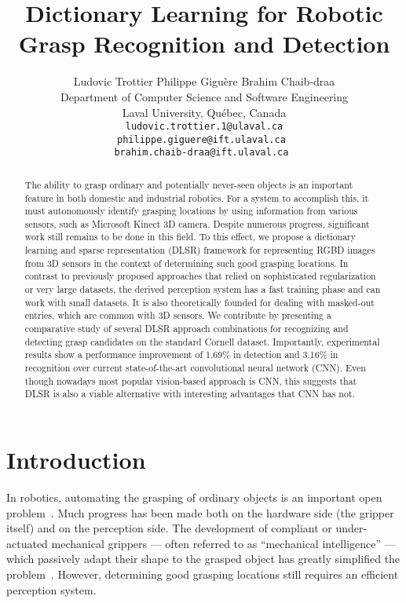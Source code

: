 \documentclass[svgnames]{scrartcl}
\title{Dictionary Learning for Robotic Grasp Recognition and Detection}
\author{
  Ludovic Trottier \qquad  Philippe Gigu\`ere  \qquad  Brahim Chaib-draa \\
  Department of Computer Science and Software Engineering \\
  Laval University, Qu\'ebec, Canada \\
  \texttt{ludovic.trottier.1@ulaval.ca} \\
  \texttt{philippe.giguere@ift.ulaval.ca } \\
  \texttt{brahim.chaib-draa@ift.ulaval.ca } \\
}
\date{}
\begin{document}
\maketitle

\begin{abstract}

The ability to grasp ordinary and potentially never-seen objects is an important feature in both domestic and industrial robotics. For a system to accomplish this, it must autonomously identify grasping locations by using information from various sensors, such as Microsoft Kinect 3D camera. Despite numerous progress, significant work still remains to be done in this field. To this effect, we propose a dictionary learning and sparse representation (DLSR) framework for representing RGBD images from 3D sensors in the context of determining such good grasping locations. In contrast to previously proposed approaches that relied on sophisticated regularization or very large datasets, the derived perception system has a fast training phase and can work with small datasets. It is also theoretically founded for dealing with masked-out entries, which are common with 3D sensors. We contribute by presenting a comparative study of several DLSR approach combinations for recognizing and detecting grasp candidates on the standard Cornell dataset. Importantly, experimental results show a performance improvement of 1.69\% in detection and 3.16\% in recognition over current state-of-the-art convolutional neural network (CNN). Even though nowadays most popular vision-based approach is CNN, this suggests that DLSR is also a viable alternative with interesting advantages that CNN has not.

\end{abstract}


\section{Introduction}
In robotics, automating the grasping of ordinary objects is an important open problem~\citep{redmonRealtimeCnnGrasp}. Much progress has been made both on the hardware side (the gripper itself) and on the perception side. The development of compliant or under-actuated mechanical grippers --- often referred to as ``mechanical intelligence'' --- which passively adapt their shape to the grasped object has greatly simplified the problem~\citep{laliberte2002underactuation}. However, determining good grasping locations still requires an efficient perception system. 
\end{document}
